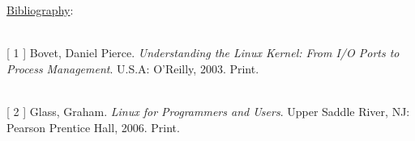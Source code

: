 \documentclass[12pt]{extarticle}
\begin{document}
\newpage
\noindent
{\large \underline{Bibliography}:}

\ \\
{[} 1 {]} \hspace{1.2mm} Bovet, Daniel Pierce. \textit{Understanding the Linux Kernel: From I/O Ports to Process}
\hspace*{1cm} \textit{Management}. U.S.A: O'Reilly, 2003. Print.

\ \\
{[} 2 {]} \hspace{1.2mm} Glass, Graham. \textit{Linux for Programmers and Users}. Upper Saddle River, NJ: Pearson
\hspace*{1cm} Prentice Hall, 2006. Print.
\end{document}
